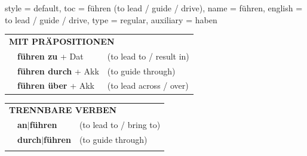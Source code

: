 \begin{verbentry}{
  style = {default},
  toc = {führen (to lead / guide / drive)},
  name = {führen},
  english = {to lead / guide / drive},
  type = {regular},
  auxiliary = {haben}
}
 \vspace{10pt}

\begin{tabular}{lll}
      \multicolumn{3}{l}{\textbf{MIT PRÄPOSITIONEN}}\\
& \textbf{führen zu} + Dat & (to lead to / result in)\\
& \textbf{führen durch} + Akk & (to guide through)\\
& \textbf{führen über} + Akk & (to lead across / over)\\
\end{tabular}
  \hfill
\begin{tabular}{lll}
      \multicolumn{3}{l}{\textbf{TRENNBARE VERBEN}}\\
 & \textbf{an$|$führen} & (to lead to / bring to)\\
 & \textbf{durch$|$führen} & (to guide through)\\
\vspace{10pt}
  \end{tabular}


\vspace{-5pt}
\end{verbentry}

